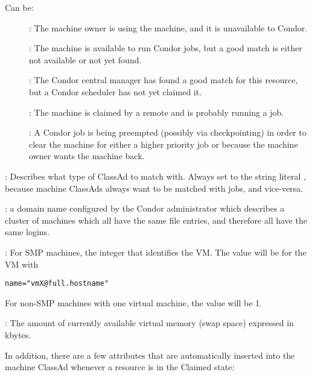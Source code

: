 \begin{description}
Can be:
	\begin{description}
	\item[] : The machine owner is using the machine, and
it is unavailable to Condor.
	\item[] : The machine is available to run Condor jobs,
but a good match is either not available or not 
yet found.
	\item[] : The Condor central manager has found a good
match for this resource, but a Condor scheduler has not yet claimed it.
	\item[] : The machine is claimed by a remote
 and is probably running a job.
	\item[] : A Condor job is being preempted (possibly
via checkpointing) in order to clear the machine for either a higher
priority job or because the machine owner wants the machine back.
	\end{description}   %
%
\item[\AdAttr{TargetType}] : Describes what type of ClassAd to match with.
Always set to the string literal , because machine ClassAds
always want to be matched with jobs, and vice-versa.
%
\item[\AdAttr{UidDomain}] : a domain name configured by the Condor 
administrator which describes a cluster of machines which all have 
the same  file entries, and therefore all have the same logins.
%
\item[\AdAttr{VirtualMachineID}] : For SMP machines, the integer
that identifies the VM.
The value will be \verb@X@ for the VM with 
\begin{verbatim}
name="vmX@full.hostname"
\end{verbatim}
For non-SMP machines with one virtual machine, the value will be 1.
%
\item[\AdAttr{VirtualMemory}] : The amount of currently available virtual memory 
(swap space) expressed in kbytes.

\end{description}

In addition, there are a few attributes that are automatically
inserted into the machine ClassAd whenever a resource is in the
Claimed state:


